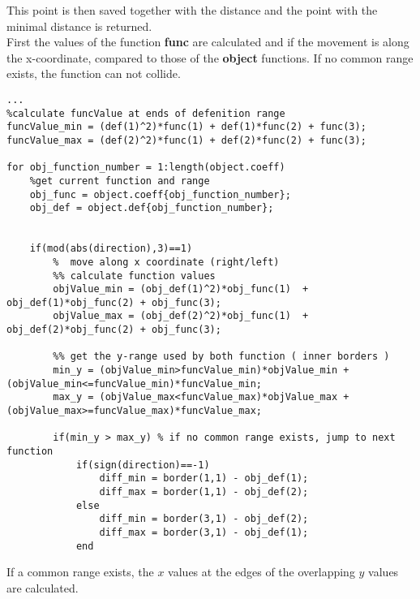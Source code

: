 This point is then saved together with the distance and the point with the minimal distance is returned.\\
First the values of the function \textbf{func} are calculated and if the movement is along the x-coordinate, compared to those of the \textbf{object} functions. If no common range exists, the function can not collide.
\begin{lstlisting}
...
%calculate funcValue at ends of defenition range
funcValue_min = (def(1)^2)*func(1) + def(1)*func(2) + func(3);
funcValue_max = (def(2)^2)*func(1) + def(2)*func(2) + func(3);

for obj_function_number = 1:length(object.coeff)
    %get current function and range
    obj_func = object.coeff{obj_function_number};
    obj_def = object.def{obj_function_number};
    
 
    if(mod(abs(direction),3)==1)
        %  move along x coordinate (right/left)
        %% calculate function values
        objValue_min = (obj_def(1)^2)*obj_func(1)  + obj_def(1)*obj_func(2) + obj_func(3);
        objValue_max = (obj_def(2)^2)*obj_func(1)  + obj_def(2)*obj_func(2) + obj_func(3);
        
        %% get the y-range used by both function ( inner borders )
        min_y = (objValue_min>funcValue_min)*objValue_min + (objValue_min<=funcValue_min)*funcValue_min;
        max_y = (objValue_max<funcValue_max)*objValue_max + (objValue_max>=funcValue_max)*funcValue_max;
        
        if(min_y > max_y) % if no common range exists, jump to next function
            if(sign(direction)==-1)
                diff_min = border(1,1) - obj_def(1);
                diff_max = border(1,1) - obj_def(2);
            else
                diff_min = border(3,1) - obj_def(2);
                diff_max = border(3,1) - obj_def(1);
            end
\end{lstlisting}
  If a common range exists, the $x$ values at the edges of the overlapping $y$ values are calculated.

